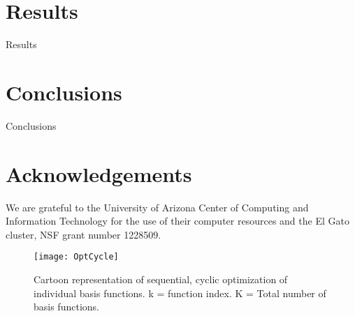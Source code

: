 \documentclass[aps,onecolumn]{revtex4}
\begin{document}
\section{Results}
\label{Results}
Results

\section{Conclusions}
Conclusions

\section{Acknowledgements}
We are grateful to the University of Arizona Center of Computing and Information Technology
for the use of their computer resources and the El Gato cluster, NSF grant number 1228509.

\newpage



\newpage

\begin{figure}
\caption{Cartoon representation of sequential, cyclic optimization of individual basis functions.
k = function index. K = Total number of basis functions.}
\texttt{[image: OptCycle]}
\label{OptCyc}
\end{figure}
\end{document}
